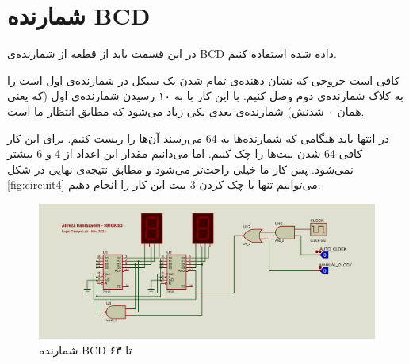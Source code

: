 \chapter{
شمارنده BCD
}

در این قسمت باید از قطعه از شمارنده‌ی 
BCD
داده شده استفاده کنیم.

کافی است خروجی که نشان دهنده‌ی تمام شدن یک سیکل در شمارنده‌ی اول است را به کلاک شمارنده‌ی دوم وصل کنیم.
با این کار با به ۱۰ رسیدن شمارنده‌ی اول
(که یعنی همان ۰ شدنش)
شمارنده‌ی بعدی یکی زیاد می‌شود که مطابق انتظار ما است.

در انتها باید هنگامی که شمارنده‌ها به
64
می‌رسند آن‌ها را ریست کنیم.
برای این کار کافی
64
شدن بیت‌ها را چک کنیم.
اما می‌دانیم مقدار این اعداد از
4 و 
6
بیشتر نمی‌شود.
پس کار ما خیلی راحت‌تر می‌شود و مطابق نتیجه‌ی نهایی در شکل
\eqref{fig:circuit4}
می‌توانیم تنها با چک کردن
3 بیت
این کار را انجام دهیم.


\begin{figure}
    \centering
    \includegraphics[width=\textwidth]{part3/3.png}
    \caption{
    شمارنده BCD
    تا ۶۳
    }
    \label{fig:circuit4}
\end{figure}